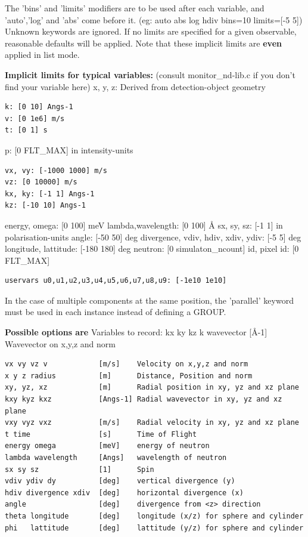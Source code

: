 The 'bins' and 'limits' modifiers are to be used after each variable, and 'auto','log' and 'abs' come before it. (eg: auto abs log hdiv bins=10 limits=[-5 5]) Unknown keywords are ignored. If no limits are specified for a given observable, reasonable defaults will be applied. Note that these implicit limits are \textbf{even} applied in list mode.

\textbf{Implicit limits for typical variables:} (consult monitor\_nd-lib.c if you don't find your variable here) x, y, z: Derived from detection-object geometry

\begin{verbatim}
k: [0 10] Angs-1
v: [0 1e6] m/s
t: [0 1] s
\end{verbatim}

p: [0 FLT\_MAX] in intensity-units

\begin{verbatim}
vx, vy: [-1000 1000] m/s
vz: [0 10000] m/s
kx, ky: [-1 1] Angs-1
kz: [-10 10] Angs-1
\end{verbatim}

energy, omega: [0 100] meV lambda,wavelength: [0 100] \AA{} sx, sy, sz: [-1 1] in polarisation-units angle: [-50 50] deg divergence, vdiv, hdiv, xdiv, ydiv: [-5 5] deg longitude, lattitude: [-180 180] deg neutron: [0 simulaton\_ncount] id, pixel id: [0 FLT\_MAX]

\begin{verbatim}
uservars u0,u1,u2,u3,u4,u5,u6,u7,u8,u9: [-1e10 1e10]
\end{verbatim}

In the case of multiple components at the same position, the 'parallel' keyword must be used in each instance instead of defining a GROUP.

\textbf{Possible options are} Variables to record: kx ky kz k wavevector [\AA{}-1] Wavevector on x,y,z and norm

\begin{verbatim}
vx vy vz v            [m/s]    Velocity on x,y,z and norm
x y z radius          [m]      Distance, Position and norm
xy, yz, xz            [m]      Radial position in xy, yz and xz plane
kxy kyz kxz           [Angs-1] Radial wavevector in xy, yz and xz plane
vxy vyz vxz           [m/s]    Radial velocity in xy, yz and xz plane
t time                [s]      Time of Flight
energy omega          [meV]    energy of neutron
lambda wavelength     [Angs]   wavelength of neutron
sx sy sz              [1]      Spin
vdiv ydiv dy          [deg]    vertical divergence (y)
hdiv divergence xdiv  [deg]    horizontal divergence (x)
angle                 [deg]    divergence from <z> direction
theta longitude       [deg]    longitude (x/z) for sphere and cylinder
phi   lattitude       [deg]    lattitude (y/z) for sphere and cylinder
\end{verbatim}


